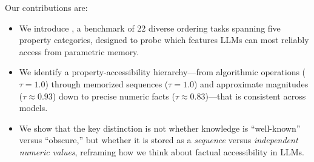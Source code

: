 Our contributions are:
\begin{itemize}[leftmargin=*,itemsep=0pt,topsep=0pt]
    \item We introduce \benchname, a benchmark of 22 diverse ordering tasks spanning five property categories, designed to probe which features LLMs can most reliably access from parametric memory.
    \item We identify a property-accessibility hierarchy---from algorithmic operations ($\tau = 1.0$) through memorized sequences ($\tau = 1.0$) and approximate magnitudes ($\tau \approx 0.93$) down to precise numeric facts ($\tau \approx 0.83$)---that is consistent across models.
    \item We show that the key distinction is not whether knowledge is ``well-known'' versus ``obscure,'' but whether it is stored as a \emph{sequence} versus \emph{independent numeric values}, reframing how we think about factual accessibility in LLMs.
\end{itemize}
